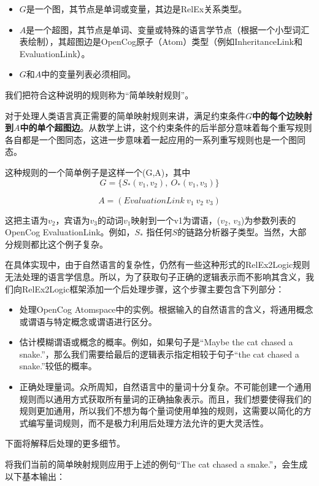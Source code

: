 \begin{itemize}
\item $G$是一个图，其节点是单词或变量，其边是RelEx关系类型。
\item  $A$是一个超图，其节点是单词、变量或特殊的语言学节点（根据一个小型词汇表绘制），其超图边是OpenCog原子（Atom）类型（例如InheritanceLink和EvaluationLink）。
\item $G$和$A$中的变量列表必须相同。
\end{itemize}

我们把符合这种说明的规则称为“简单映射规则”。

对于处理人类语言真正需要的简单映射规则来讲，满足约束条件{\bf $G$中的每个边映射到$A$中的单个超图边}。从数学上讲，这个约束条件的后半部分意味着每个重写规则各自都是一个图同态\cite{Voloshin2009}，这进一步意味着一起应用的一系列重写规则也是一个图同态。

这种规则的一个简单例子是这样一个(G,A)，其中
$$
G = \{ S_*(v_1,v_2), \ O_*(v_1, v_3) \}
$$

$$
A = (EvaluationLink \ v_1 \ v_2 \ v_3)
$$

这把主语为$v_2$，宾语为$v_3$的动词$v_1$映射到一个v1为谓语，($v_2$, $v_3$)为参数列表的OpenCog EvaluationLink。例如，$S_*$ 指任何$S$的链路分析器子类型。当然，大部分规则都比这个例子复杂。

在具体实现中，由于自然语言的复杂性，仍然有一些这种形式的RelEx2Logic规则无法处理的语言学信息。所以，为了获取句子正确的逻辑表示而不影响其含义，我们向RelEx2Logic框架添加一个后处理步骤，这个步骤主要包含下列部分：

\begin{itemize}
\item 处理OpenCog Atomspace中的实例。根据输入的自然语言的含义，将通用概念或谓语与特定概念或谓语进行区分。
\item 估计模糊谓语或概念的概率。例如，如果句子是“Maybe the cat chased a snake.”，那么我们需要给最后的逻辑表示指定相较于句子“the cat chased a snake.”较低的概率。
\item 正确处理量词。众所周知，自然语言中的量词十分复杂。不可能创建一个通用规则而以通用方式获取所有量词的正确抽象表示。而且，我们想要使得我们的规则更加通用，所以我们不想为每个量词使用单独的规则，这需要以简化的方式编写量词规则，而不是极力利用后处理方法允许的更大灵活性。
\end{itemize}

下面将解释后处理的更多细节。

将我们当前的简单映射规则应用于上述的例句“The cat chased a snake.”，会生成以下基本输出：

